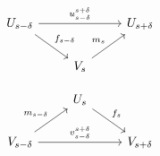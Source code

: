 \begin{minipage}{0.45\textwidth}
\begin{equation}\label{dgm:interleaving1}
  \begin{tikzcd}
    U_{s-\delta}\arrow{rr}{u_{s-\delta}^{s+\delta}}\arrow{dr}{f_{s-\delta}} & &
    U_{s+\delta}\\
    & V_{s}\arrow{ur}{m_s} &
\end{tikzcd}\end{equation}
\end{minipage}
\begin{minipage}{0.45\textwidth}
\begin{equation}\label{dgm:interleaving2}
  \begin{tikzcd}
    & U_{s}\arrow{dr}{f_s} &\\
    V_{s-\delta}\arrow{rr}{v_{s-\delta}^{s+\delta}}\arrow{ur}{m_{s-\delta}} & &
    V_{s+\delta}
\end{tikzcd}\end{equation}
\end{minipage}

%
%
